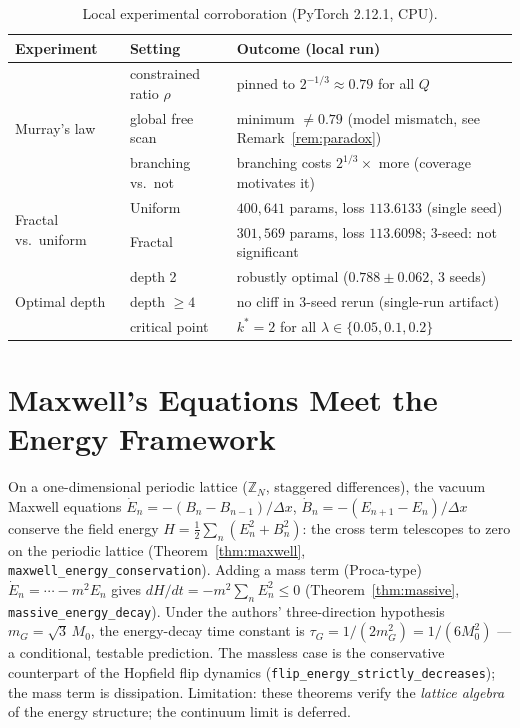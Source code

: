 \documentclass[conference]{IEEEtran}
\begin{document}
\begin{table}[!t]
\renewcommand{\arraystretch}{1.2}
\caption{Local experimental corroboration (PyTorch 2.12.1, CPU).}
\label{table_experiments}
\centering
\begin{tabular}{@{}ll@{}l@{}}
\toprule
Experiment & Setting & Outcome (local run) \\
\midrule
\multirow{3}{*}{Murray's law}
 & constrained ratio $\rho$ & pinned to $2^{-1/3}\approx0.79$ for all $Q$ \\
 & global free scan & minimum $\not=0.79$ (model mismatch, see Remark~\ref{rem:paradox}) \\
 & branching vs.\ not & branching costs $2^{1/3}\times$ more (coverage motivates it) \\
\midrule
\multirow{2}{*}{Fractal vs.\ uniform}
 & Uniform & $400{,}641$ params, loss $113.6133$ (single seed) \\
 & Fractal & $301{,}569$ params, loss $113.6098$; 3-seed: not significant \\
\midrule
\multirow{3}{*}{Optimal depth}
 & depth 2 & robustly optimal ($0.788\pm0.062$, 3 seeds) \\
 & depth $\geq4$ & no cliff in 3-seed rerun (single-run artifact) \\
 & critical point & $k^*=2$ for all $\lambda\in\{0.05,0.1,0.2\}$ \\
\bottomrule
\end{tabular}
\end{table}


\section{Maxwell's Equations Meet the Energy Framework}
\label{sec:maxwell}
On a one-dimensional periodic lattice ($\mathbb{Z}_N$, staggered differences),
the vacuum Maxwell equations $\dot E_n = -(B_n - B_{n-1})/\Delta x$,
$\dot B_n = -(E_{n+1} - E_n)/\Delta x$ conserve the field energy
$H = \tfrac12\sum_n(E_n^2+B_n^2)$: the cross term telescopes to zero on the
periodic lattice (Theorem~\ref{thm:maxwell},
\texttt{maxwell\_energy\_conservation}). Adding a mass term
(Proca-type) $\dot E_n = \cdots - m^2 E_n$ gives
$dH/dt = -m^2\sum_n E_n^2 \le 0$ (Theorem~\ref{thm:massive},
\texttt{massive\_energy\_decay}). Under the authors' three-direction
hypothesis $m_G = \sqrt3\,M_0$, the energy-decay time constant is
$\tau_G = 1/(2m_G^2) = 1/(6M_0^2)$ --- a conditional, testable prediction.
The massless case is the conservative counterpart of the Hopfield flip
dynamics (\texttt{flip\_energy\_strictly\_decreases}); the mass term is
dissipation. Limitation: these theorems verify the \emph{lattice algebra} of
the energy structure; the continuum limit is deferred.
\end{document}

